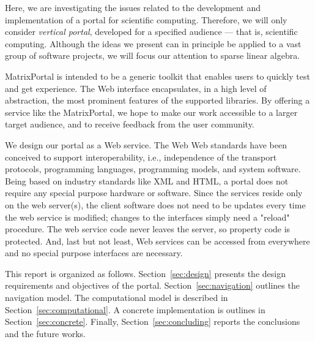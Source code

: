 \documentclass[11pt,relax]{SANDreport}
\begin{document}
Here, we are investigating the issues related to the development
and implementation of a portal for scientific computing. Therefore, we will
only consider {\sl vertical portal}, developed for a specified audience ---
that is, scientific computing. Although the ideas we present can in principle
be applied to a vast group of software projects, we will focus our attention
to sparse linear algebra.

MatrixPortal is intended to be a generic
toolkit that enables users to quickly test and get experience. The Web
interface encapsulates, in a high level of abstraction, the most prominent
features of the supported libraries. By offering a service like the
MatrixPortal, we hope to make our work
accessible to a larger target audience, and to receive feedback from the user
community.

We design our portal as a Web service. The Web Web standards have been
conceived to support interoperability, i.e., independence of the transport
protocols, programming languages, programming models, and system software.
Being based on industry standards like XML and HTML, a portal does not require
any special purpose hardware or software.  Since the services reside only on
the web server(s), the client software does not need to be updates every time
the web service is modified; changes to the interfaces simply need a "reload"
procedure.  The web service code never leaves the server, so property code is
protected. And, last but not least, Web services can be accessed from
everywhere and no special purpose interfaces are necessary.

\medskip

This report is organized as follows. Section~\ref{sec:design} presents the
design requirements and objectives of the portal.
Section~\ref{sec:navigation} outlines the navigation model.  The computational
model is described in Section~\ref{sec:computational}. A concrete
implementation is outlines in Section~\ref{sec:concrete}.  Finally,
               Section~\ref{sec:concluding} reports the conclusions and the
               future works.
\end{document}
